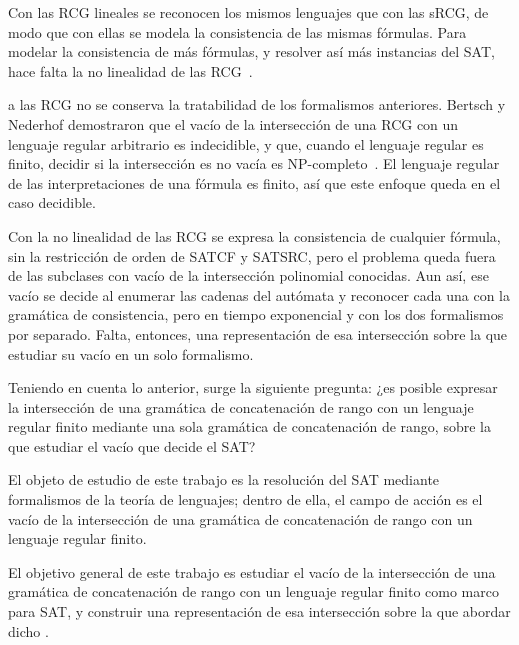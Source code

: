 \documentclass{report}
\begin{document}

Con las RCG lineales se reconocen los mismos lenguajes que con las sRCG,
de modo que con ellas se modela la consistencia de las mismas fórmulas.
Para modelar la consistencia de más fórmulas, y resolver así más
instancias del SAT, hace falta la no linealidad de las RCG~\cite{boullier1998proposal}.

 a las RCG no se conserva la
tratabilidad de los formalismos anteriores. Bertsch y Nederhof demostraron que
el vacío de la intersección de una RCG con un lenguaje regular arbitrario es
indecidible, y que, cuando el lenguaje regular es finito, decidir si la
intersección es no vacía es NP-completo~\cite{bertsch2001rcg}. El lenguaje
regular de las interpretaciones de una fórmula es finito, así que este enfoque
queda en el caso decidible. 

Con la no linealidad de las RCG se expresa la consistencia de cualquier fórmula,
sin la restricción de orden de SATCF y SATSRC, pero el problema queda fuera de
las subclases con vacío de la intersección polinomial conocidas.  Aun así, ese
vacío se decide al enumerar las cadenas del autómata y reconocer cada una con la
gramática de consistencia, pero en tiempo exponencial y con los dos formalismos
por separado. Falta, entonces, una representación de esa intersección sobre la
que estudiar su vacío en un solo formalismo.

Teniendo en cuenta lo anterior, surge la siguiente pregunta:
¿es posible expresar la intersección de una gramática de concatenación de
rango con un lenguaje regular finito mediante una sola gramática de
concatenación de rango, sobre la que estudiar el vacío que decide el SAT?

El objeto de estudio de este trabajo es la resolución del SAT mediante
formalismos de la teoría de lenguajes; dentro de ella, el campo de acción
es el vacío de la intersección de una gramática de concatenación de rango
con un lenguaje regular finito.

El objetivo general de este trabajo es estudiar el vacío de la
intersección de una gramática de concatenación de rango con un lenguaje
regular finito como marco para  SAT, y construir una representación de
esa intersección sobre la que abordar dicho .
\end{document}

